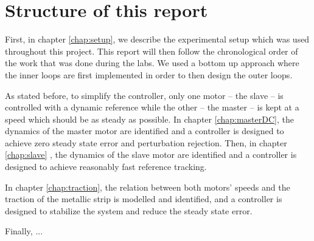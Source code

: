 \section{Structure of this report}
First, in chapter \ref{chap:setup}, we describe the experimental setup which was used throughout this project. This report will then follow the chronological order of the work that was done during the labs. We used a bottom up approach where the inner loops are first implemented in order to then design the outer loops.

As stated before, to simplify the controller, only one motor -- the slave -- is controlled with a dynamic reference while the other -- the master -- is kept at a speed which should be as steady as possible. In chapter \ref{chap:masterDC}, the dynamics of the master motor are identified and a controller is designed to achieve zero steady state error and perturbation rejection. Then, in chapter \ref{chap:slave} , the dynamics of the slave motor are identified and a controller is designed to achieve reasonably fast reference tracking.

In chapter \ref{chap:traction}, the relation between both motors' speeds and the traction of the metallic strip is modelled and identified, and a controller is designed to stabilize the system and reduce the steady state error.

Finally, ... 




